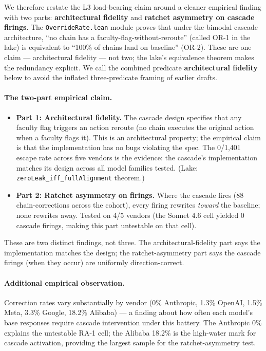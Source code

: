 \documentclass[11pt,a4paper]{article}
\begin{document}
We therefore restate the L3 load-bearing claim around a cleaner empirical finding with two parts: \textbf{architectural fidelity} and \textbf{ratchet asymmetry on cascade firings}. The \texttt{OverrideRate.lean} module proves that under the bimodal cascade architecture, ``no chain has a faculty-flag-without-reroute'' (called OR-1 in the lake) is equivalent to ``100\% of chains land on baseline'' (OR-2). These are one claim --- architectural fidelity --- not two; the lake's equivalence theorem makes the redundancy explicit. We call the combined predicate \textbf{architectural fidelity} below to avoid the inflated three-predicate framing of earlier drafts.

\paragraph{The two-part empirical claim.}
\begin{itemize}
  \item \textbf{Part 1: Architectural fidelity.} The cascade design specifies that any faculty flag triggers an action reroute (no chain executes the original action when a faculty flags it). This is an architectural property; the empirical claim is that the implementation has no bugs violating the spec. The 0/1,401 escape rate across five vendors is the evidence: the cascade's implementation matches its design across all model families tested. (Lake: \texttt{zeroLeak\_iff\_fullAlignment} theorem.)
  \item \textbf{Part 2: Ratchet asymmetry on firings.} Where the cascade fires (88 chain-corrections across the cohort), every firing rewrites \emph{toward} the baseline; none rewrites away. Tested on 4/5 vendors (the Sonnet 4.6 cell yielded 0 cascade firings, making this part untestable on that cell).
\end{itemize}

These are two distinct findings, not three. The architectural-fidelity part says the implementation matches the design; the ratchet-asymmetry part says the cascade firings (when they occur) are uniformly direction-correct.

\paragraph{Additional empirical observation.} Correction rates vary substantially by vendor (0\% Anthropic, 1.3\% OpenAI, 1.5\% Meta, 3.3\% Google, 18.2\% Alibaba) --- a finding about how often each model's base responses require cascade intervention under this battery. The Anthropic 0\% explains the untestable RA-1 cell; the Alibaba 18.2\% is the high-water mark for cascade activation, providing the largest sample for the ratchet-asymmetry test.
\end{document}

